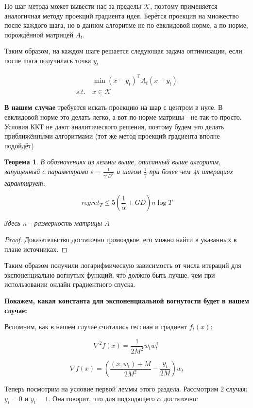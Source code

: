 \documentclass[12pt]{article}
\newtheorem*{theorem}{Теорема}
\theoremstyle{definition}
\begin{document}
Но шаг метода может вывести нас за пределы $\mathcal{K}$, поэтому применяется аналогичная методу проекций градиента идея. Берётся проекция на множество после каждого шага, но в данном алгоритме не по евклидовой норме, а по норме, порождённой матрицей $A_t$.

Таким образом, на каждом шаге решается следующая задача оптимизации, если после шага получилась точка $y_t$

\begin{align*}
&\min (x - y_t)^\top A_t(x - y_t) \\
s.t.\ & x \in \mathcal{K}
\end{align*}

\textbf{В нашем случае} требуется искать проекцию на шар с центром в нуле. В евклидовой норме это делать легко, а вот по норме матрицы - не так-то просто. Условия ККТ не дают аналитического решения, поэтому будем это делать приближёнными алгоритмами (тот же метод проекций градиента вполне подойдёт)

\begin{theorem}
В обозначениях из леммы выше, описанный выше алгоритм, запущенный с параметрами $\varepsilon = \frac{1}{\gamma^2 D^2}$ и шагом $\frac{1}{\gamma}$ при более чем 4х итерациях гарантирует:

$$ regret_T \leqslant 5(\frac{1}{\alpha} + GD) n \log T $$

Здесь $n$ - размерность матрицы $A$
\end{theorem}
	
\begin{proof}
	Доказательство достаточно громоздкое, его можно найти в указанных в плане источниках.
\end{proof}

Таким образом получили логарифмическую зависимость от числа итераций для экспоненциально-вогнутых функций, что должно быть лучше, чем при использовании онлайн градиентного спуска.

\bigskip
\textbf{Покажем, какая константа для экспоненциальной вогнутости будет в нашем случае:}

Вспомним, как в нашем случае считались гессиан и градиент $f_t(x)$:

$$ \nabla^2 f(x) = \frac{1}{2M^2} w_t w_t^\top $$

$$ \nabla f(x) = \left(\frac{(x, w_t) + M}{2M^2} - \frac{y_t}{2M}\right) w_t $$

Теперь посмотрим на условие первой леммы этого раздела. Рассмотрим 2 случая: $y_t = 0$ и $y_t = 1$. Она говорит, что для подходящего $\alpha$ достаточно:
\end{document}

